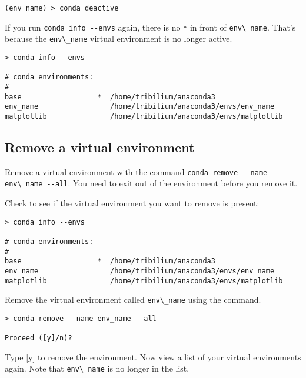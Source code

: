 \documentclass{book}
\newcommand{\passthrough}[1]{#1}
\begin{document}
\begin{lstlisting}
(env_name) > conda deactive
\end{lstlisting}

If you run \passthrough{\lstinline!conda info --envs!} again, there is
no \passthrough{\lstinline!*!} in front of
\passthrough{\lstinline!env\_name!}. That's because the
\passthrough{\lstinline!env\_name!} virtual environment is no longer
active.

\begin{lstlisting}
> conda info --envs

# conda environments:
#
base                  *  /home/tribilium/anaconda3
env_name                 /home/tribilium/anaconda3/envs/env_name
matplotlib               /home/tribilium/anaconda3/envs/matplotlib
\end{lstlisting}
    




    
        \hypertarget{remove-a-virtual-environment}{%
\subsection{Remove a virtual
environment}\label{remove-a-virtual-environment}}

Remove a virtual environment with the command
\passthrough{\lstinline!conda remove --name env\_name --all!}. You need
to exit out of the environment before you remove it.

Check to see if the virtual environment you want to remove is present:

\begin{lstlisting}
> conda info --envs

# conda environments:
#
base                  *  /home/tribilium/anaconda3
env_name                 /home/tribilium/anaconda3/envs/env_name
matplotlib               /home/tribilium/anaconda3/envs/matplotlib
\end{lstlisting}

Remove the virtual environment called
\passthrough{\lstinline!env\_name!} using the command.

\begin{lstlisting}
> conda remove --name env_name --all

Proceed ([y]/n)?
\end{lstlisting}

Type {[}y{]} to remove the environment. Now view a list of your virtual
environments again. Note that \passthrough{\lstinline!env\_name!} is no
longer in the list.
\end{document}
